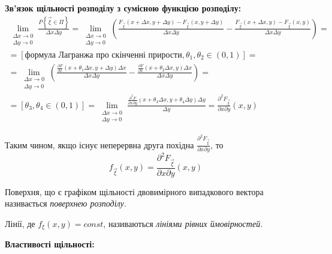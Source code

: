 \noindent\textbf{Зв’язок щільності розподілу з сумісною функцією розподілу: }
\begin{gather*}
    \lim_{\substack{\Delta x \to 0 \\ 
\Delta y \to 0}} \frac{P\left\{\vec{\xi} \in \Pi\right\}}
{\Delta x \Delta y} = 
\lim_{\substack{\Delta x \to 0 \\ \Delta y \to 0}} 
\left(
    \frac{F_{\vec{\xi}}(x+\Delta x, y+\Delta y) - F_{\vec{\xi}}(x, y+\Delta y)}
    {\Delta x \Delta y}
    -
    \frac{F_{\vec{\xi}}(x+\Delta x, y) - F_{\vec{\xi}}(x, y)}
    {\Delta x \Delta y}
\right) = \\
= \left[\text{формула Лагранжа про скінченні прирости}, \theta_1, \theta_2 \in (0, 1)\right] = \\
= \lim_{\substack{\Delta x \to 0 \\ \Delta y \to 0}} 
\left(
    \frac{\frac{\partial F}{\partial x}(x + \theta_1 \Delta x, y + \Delta y)\Delta x}
    {\Delta x \Delta y}
    -
    \frac{\frac{\partial F}{\partial x}(x + \theta_2 \Delta x, y)\Delta x}
    {\Delta x \Delta y}
\right) =  \\
= \left[\theta_3, \theta_4 \in (0, 1)\right] 
= \lim_{\substack{\Delta x \to 0 \\ \Delta y \to 0}}
\frac{\frac{\partial^2 F}{\partial x \partial y}(x + \theta_3 \Delta x, 
y + \theta_4 \Delta y)\Delta y}
{\Delta y} = \frac{\partial^2 F_{\vec{\xi}}}{\partial x \partial y}(x, y)\end{gather*}

Таким чином, якщо існує неперервна друга похідна $ \frac{\partial^2 F_{\vec{\xi}}}{\partial x \partial y}$, то
\begin{equation}\label{eq:dens_r2}
    f_{\vec{\xi}}(x, y) = \frac{\partial^2 F_{\vec{\xi}}}{\partial x \partial y}(x, y)
\end{equation}

\begin{definition}
    Поверхня, що є графіком щільності двовимірного випадкового вектора називається 
    \emph{поверхнею розподілу}.
\end{definition}
\begin{definition}
    Лінії, де $f_\xi(x, y) = const$, називаються \emph{лініями рівних ймовірностей}.
\end{definition}

\noindent\textbf{Властивості щільності: }

